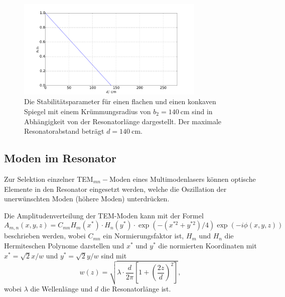 \begin{figure}
    \centering
    \includegraphics[width=0.8\textwidth]{plots/stability2.pdf}
    \caption{Die Stabilitätsparameter für einen flachen und einen konkaven Spiegel mit einem Krümmungsradius von $b_2 = \SI{140}{\centi\meter}$ sind in Abhängigkeit von der Resonatorlänge dargestellt. Der maximale Resonatorabstand beträgt $d = \SI{140}{\centi\meter}$.}
    \label{fig:stability2}
\end{figure}

\subsection{Moden im Resonator}
\label{sec:model}

Zur Selektion einzelner TEM$_{mn}-$Moden eines Multimodenlasers können optische Elemente in den Resonator eingesetzt werden, welche die Oszillation der unerwünschten Moden (höhere Moden) unterdrücken.

Die Amplitudenverteilung der TEM-Moden kann mit der Formel 
\begin{equation}
    A_{m,n}\left(x,y,z\right) = C_{mn} H_m\left(x^*\right)\cdot H_n\left(y^*\right) \cdot \exp\left(-\left( x^{*2} + y^{*2} \right)/4 \right) \exp\left( -i \phi \left( x,y,z \right)\right) 
    \label{eq:amp}
\end{equation}
beschrieben werden, wobei $C_{mn}$ ein Normierungsfaktor ist, $H_m$ und $H_n$ die Hermiteschen Polynome darstellen und $x^*$ und $y^*$ die normierten Koordinaten mit $x^*= \sqrt{2} x/w$ und  $y^*= \sqrt{2} y/w$ sind mit 
\begin{equation*}
    w(z) = \sqrt{\lambda \cdot \frac{d}{2\pi}\left[ 1 + \left(\frac{2z}{d} \right)^2 \right]},
\end{equation*}
wobei $\lambda$ die Wellenlänge und $d$ die Resonatorlänge ist.

